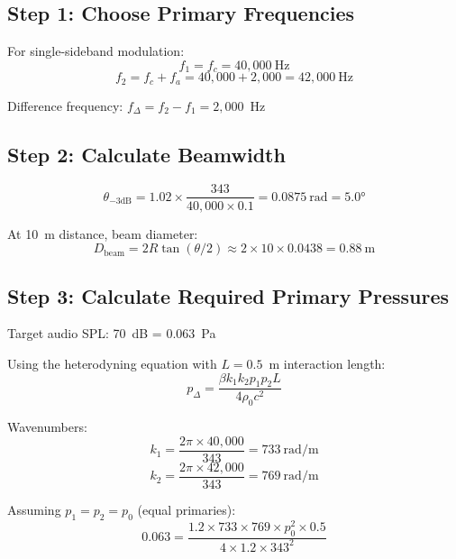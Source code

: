 \subsection*{Step 1: Choose Primary Frequencies}

For single-sideband modulation:
\begin{equation}
f_1 = f_c = 40{,}000~\text{Hz}
\end{equation}
\begin{equation}
f_2 = f_c + f_a = 40{,}000 + 2{,}000 = 42{,}000~\text{Hz}
\end{equation}

Difference frequency: $f_\Delta = f_2 - f_1 = 2{,}000$~Hz \checkmark

\subsection*{Step 2: Calculate Beamwidth}

\begin{equation}
\theta_{-3\text{dB}} = 1.02 \times \frac{343}{40{,}000 \times 0.1} = 0.0875~\text{rad} = 5.0°
\end{equation}

At 10~m distance, beam diameter:
\begin{equation}
D_{\text{beam}} = 2R\tan(\theta/2) \approx 2 \times 10 \times 0.0438 = 0.88~\text{m}
\end{equation}

\subsection*{Step 3: Calculate Required Primary Pressures}

Target audio SPL: 70~dB = 0.063~Pa

Using the heterodyning equation with $L = 0.5$~m interaction length:
\begin{equation}
p_\Delta = \frac{\beta k_1 k_2 p_1 p_2 L}{4\rho_0 c^2}
\end{equation}

Wavenumbers:
\begin{equation}
k_1 = \frac{2\pi \times 40{,}000}{343} = 733~\text{rad/m}
\end{equation}
\begin{equation}
k_2 = \frac{2\pi \times 42{,}000}{343} = 769~\text{rad/m}
\end{equation}

Assuming $p_1 = p_2 = p_0$ (equal primaries):
\begin{equation}
0.063 = \frac{1.2 \times 733 \times 769 \times p_0^2 \times 0.5}{4 \times 1.2 \times 343^2}
\end{equation}

